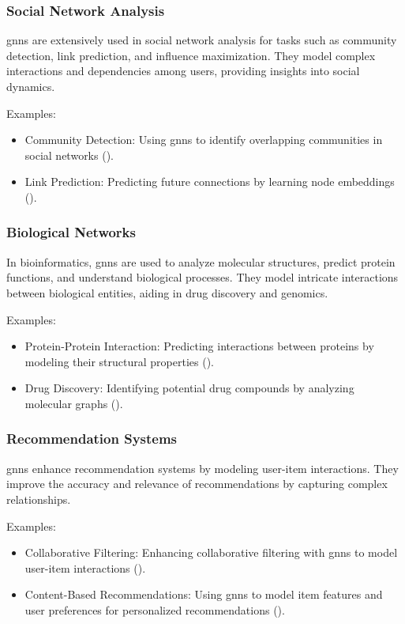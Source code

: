 \subsubsection*{Social Network Analysis}

\glspl{gnn} are extensively used in social network analysis for tasks such as community detection, link prediction, and influence maximization. They model complex interactions and dependencies among users, providing insights into social dynamics.

Examples:
\begin{itemize}
    \item Community Detection: Using \glspl{gnn} to identify overlapping communities in social networks (\cite{Chen2017}).
    \item Link Prediction: Predicting future connections by learning node embeddings (\cite{Zeng2019}).
\end{itemize}


\subsubsection*{Biological Networks}

In bioinformatics, \glspl{gnn} are used to analyze molecular structures, predict protein functions, and understand biological processes. They model intricate interactions between biological entities, aiding in drug discovery and genomics.

Examples:
\begin{itemize}
    \item Protein-Protein Interaction: Predicting interactions between proteins by modeling their structural properties (\cite{Fout2017}).
    \item Drug Discovery: Identifying potential drug compounds by analyzing molecular graphs (\cite{Jin2018}).
\end{itemize}

\subsubsection*{Recommendation Systems}

\glspl{gnn} enhance recommendation systems by modeling user-item interactions. They improve the accuracy and relevance of recommendations by capturing complex relationships.

Examples:
\begin{itemize}
    \item Collaborative Filtering: Enhancing collaborative filtering with \glspl{gnn} to model user-item interactions (\cite{Wang2019}).
    \item Content-Based Recommendations: Using \glspl{gnn} to model item features and user preferences for personalized recommendations (\cite{Ying2018}).
\end{itemize}


